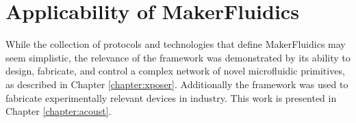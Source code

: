 \section{Applicability of MakerFluidics}
\label{sec:mfApplicability}
While the collection of protocols and technologies that define MakerFluidics may seem simplistic, the relevance of the framework was demonstrated by  its ability to design, fabricate, and control a complex network of novel microfluidic primitives, as described in Chapter \ref{chapter:xposer}. Additionally the framework was used to fabricate experimentally relevant devices in industry. This work is presented in Chapter \ref{chapter:acoust}.

